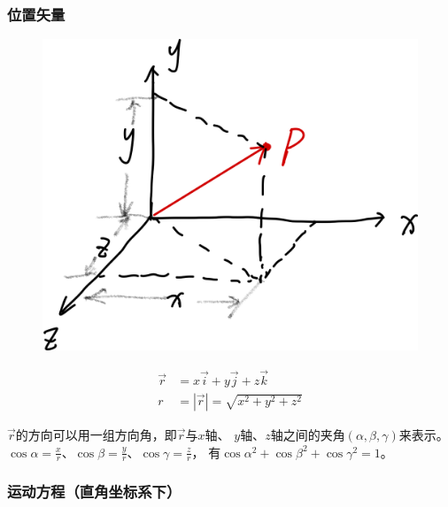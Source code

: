 \documentclass[12pt, a4paper]{article}
\numberwithin{equation}{section}
\begin{document}
\subsubsection*{位置矢量}

    \begin{figure}
        \centering
        \includegraphics[scale=0.08]{"Chapter 01 images/pic1.png"}
        \label{pic1}
    \end{figure}

    \begin{align}
        \overrightarrow{r} &= x\overrightarrow{i} + y\overrightarrow{j} + z\overrightarrow{k} \\
        r &= \left|\overrightarrow{r}\right| = \sqrt{x^2 + y^2 + z^2}
    \end{align}

    \(\overrightarrow{r}\)的方向可以用一组方向角，即\(\overrightarrow{r}\)与\(x\)轴、
    \(y\)轴、\(z\)轴之间的夹角\(\left(\alpha, \beta, \gamma\right)\)来表示。
    \(\cos \alpha = \frac{x}{r}\)、\(\cos \beta = \frac{y}{r}\)、\(\cos \gamma = \frac{z}{r}\)，
    有\(\cos \alpha ^2 + \cos \beta ^2 + \cos \gamma ^2 = 1\)。

\subsubsection*{运动方程（直角坐标系下）}
    
\end{document}
